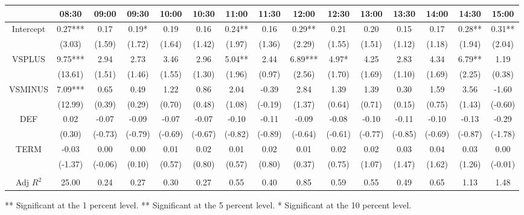 \begin{table}[h]
\begin{threeparttable}
\begin{tabular}{ccccccccccccccc}
                & 08:30   & 09:00   & 09:30   & 10:00   & 10:30   & 11:00   & 11:30   & 12:00   & 12:30   & 13:00   & 13:30   & 14:00   & 14:30   & 15:00   \\ \midrule
Intercept       & 0.27*** & 0.17    & 0.19*   & 0.19    & 0.16    & 0.24**  & 0.16    & 0.29**  & 0.21    & 0.20    & 0.15    & 0.17    & 0.28**  & 0.31**  \\
                & (3.03)  & (1.59)  & (1.72)  & (1.64)  & (1.42)  & (1.97)  & (1.36)  & (2.29)  & (1.55)  & (1.51)  & (1.12)  & (1.18)  & (1.94)  & (2.04)  \\
VSPLUS          & 9.75*** & 2.94    & 2.73    & 3.46    & 2.96    & 5.04**  & 2.44    & 6.89*** & 4.97*   & 4.25    & 2.83    & 4.34    & 6.79**  & 1.19    \\
                & (13.61) & (1.51)  & (1.46)  & (1.55)  & (1.30)  & (1.96)  & (0.97)  & (2.56)  & (1.70)  & (1.69)  & (1.10)  & (1.69)  & (2.25)  & (0.38)  \\
VSMINUS         & 7.09*** & 0.65    & 0.49    & 1.22    & 0.86    & 2.04    & -0.39   & 2.84    & 1.39    & 1.39    & 0.30    & 1.59    & 3.56    & -1.60   \\
                & (12.99) & (0.39)  & (0.29)  & (0.70)  & (0.48)  & (1.08)  & (-0.19) & (1.37)  & (0.64)  & (0.71)  & (0.15)  & (0.75)  & (1.43)  & (-0.60) \\
DEF             & 0.02    & -0.07   & -0.09   & -0.07   & -0.07   & -0.10   & -0.11   & -0.09   & -0.08   & -0.10   & -0.11   & -0.10   & -0.13   & -0.29   \\
                & (0.30)  & (-0.73) & (-0.79) & (-0.69) & (-0.67) & (-0.82) & (-0.89) & (-0.64) & (-0.61) & (-0.77) & (-0.85) & (-0.69) & (-0.87) & (-1.78) \\
TERM            & -0.03   & 0.00    & 0.00    & 0.01    & 0.02    & 0.01    & 0.02    & 0.01    & 0.02    & 0.02    & 0.03    & 0.04    & 0.03    & 0.00    \\
                & (-1.37) & (-0.06) & (0.10)  & (0.57)  & (0.80)  & (0.57)  & (0.80)  & (0.37)  & (0.75)  & (1.07)  & (1.47)  & (1.62)  & (1.26)  & (-0.01) \\
                &         &         &         &         &         &         &         &         &         &         &         &         &         &         \\
Adj $R^{2}$ & 25.00   & 0.24    & 0.27    & 0.30    & 0.27    & 0.55    & 0.40    & 0.85    & 0.59    & 0.55    & 0.49    & 0.65    & 1.13    & 1.48   \\

\bottomrule
\end{tabular}

\begin{tablenotes}
\item *** Significant at the 1 percent level.    
** Significant at the 5 percent level.   
* Significant at the 10 percent level.
\end{tablenotes}


\end{threeparttable}

\end{table}



